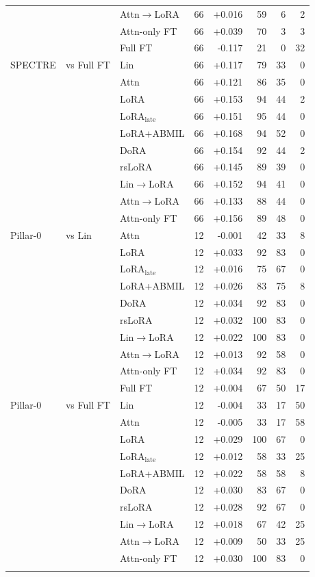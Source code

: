 \begin{tabular}{lllrrrrr}
 &  & Attn$\to$LoRA & 66 & +0.016 & 59 & 6 & 2 \\
 &  & Attn-only FT & 66 & +0.039 & 70 & 3 & 3 \\
 &  & Full FT & 66 & -0.117 & 21 & 0 & 32 \\
\addlinespace[2pt]
SPECTRE & vs Full FT & Lin & 66 & +0.117 & 79 & 33 & 0 \\
 &  & Attn & 66 & +0.121 & 86 & 35 & 0 \\
 &  & LoRA & 66 & +0.153 & 94 & 44 & 2 \\
 &  & LoRA$_{\text{late}}$ & 66 & +0.151 & 95 & 44 & 0 \\
 &  & LoRA+ABMIL & 66 & +0.168 & 94 & 52 & 0 \\
 &  & DoRA & 66 & +0.154 & 92 & 44 & 2 \\
 &  & rsLoRA & 66 & +0.145 & 89 & 39 & 0 \\
 &  & Lin$\to$LoRA & 66 & +0.152 & 94 & 41 & 0 \\
 &  & Attn$\to$LoRA & 66 & +0.133 & 88 & 44 & 0 \\
 &  & Attn-only FT & 66 & +0.156 & 89 & 48 & 0 \\
\addlinespace[2pt]
Pillar-0 & vs Lin & Attn & 12 & -0.001 & 42 & 33 & 8 \\
 &  & LoRA & 12 & +0.033 & 92 & 83 & 0 \\
 &  & LoRA$_{\text{late}}$ & 12 & +0.016 & 75 & 67 & 0 \\
 &  & LoRA+ABMIL & 12 & +0.026 & 83 & 75 & 8 \\
 &  & DoRA & 12 & +0.034 & 92 & 83 & 0 \\
 &  & rsLoRA & 12 & +0.032 & 100 & 83 & 0 \\
 &  & Lin$\to$LoRA & 12 & +0.022 & 100 & 83 & 0 \\
 &  & Attn$\to$LoRA & 12 & +0.013 & 92 & 58 & 0 \\
 &  & Attn-only FT & 12 & +0.034 & 92 & 83 & 0 \\
 &  & Full FT & 12 & +0.004 & 67 & 50 & 17 \\
\addlinespace[2pt]
Pillar-0 & vs Full FT & Lin & 12 & -0.004 & 33 & 17 & 50 \\
 &  & Attn & 12 & -0.005 & 33 & 17 & 58 \\
 &  & LoRA & 12 & +0.029 & 100 & 67 & 0 \\
 &  & LoRA$_{\text{late}}$ & 12 & +0.012 & 58 & 33 & 25 \\
 &  & LoRA+ABMIL & 12 & +0.022 & 58 & 58 & 8 \\
 &  & DoRA & 12 & +0.030 & 83 & 67 & 0 \\
 &  & rsLoRA & 12 & +0.028 & 92 & 67 & 0 \\
 &  & Lin$\to$LoRA & 12 & +0.018 & 67 & 42 & 25 \\
 &  & Attn$\to$LoRA & 12 & +0.009 & 50 & 33 & 25 \\
 &  & Attn-only FT & 12 & +0.030 & 100 & 83 & 0 \\
\addlinespace[2pt]
\bottomrule
\end{tabular}
